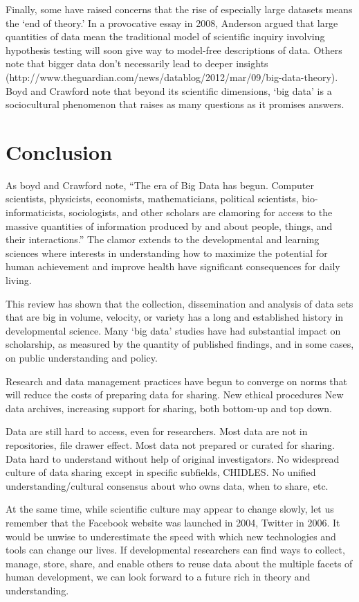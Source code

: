 \documentclass[letterpaper,man,apacite]{apa6}
\begin{document}
Finally, some have raised concerns that the rise of especially large datasets means the `end of theory.' \cite{Anderson}
In a provocative essay in 2008, Anderson argued that large quantities of data mean the traditional model of scientific inquiry involving hypothesis testing will soon give way to model-free descriptions of data.
Others note that bigger data don't necessarily lead to deeper insights \cite{Graham} (http://www.theguardian.com/news/datablog/2012/mar/09/big-data-theory).
Boyd and Crawford note \cite{boyd} that beyond its scientific dimensions, `big data' is a sociocultural phenomenon that raises as many questions as it promises answers.

\section{Conclusion}

As boyd and Crawford note, ``The era of Big Data has begun. Computer scientists, physicists, economists, mathematicians, political scientists, bio-informaticists, sociologists, and other scholars are clamoring for access to the massive quantities of information produced by and about people, things, and their interactions.'' \cite{boyd}
The clamor extends to the developmental and learning sciences where interests in understanding how to maximize the potential for human achievement and improve health have significant consequences for daily living.

This review has shown that the collection, dissemination and analysis of data sets that are big in volume, velocity, or variety has a long and established history in developmental science.
Many `big data' studies have had substantial impact on scholarship, as measured by the quantity of published findings, and in some cases, on public understanding and policy.

Research and data management practices have begun to converge on norms that will reduce the costs of preparing data for sharing.
New ethical procedures
New data archives, increasing support for sharing, both bottom-up and top down.

Data are still hard to access, even for researchers.
Most data are not in repositories, file drawer effect.
Most data not prepared or curated for sharing.
Data hard to understand without help of original investigators.
No widespread culture of data sharing except in specific subfields, CHIDLES.
No unified understanding/cultural consensus about who owns data, when to share, etc.

At the same time, while scientific culture may appear to change slowly, let us remember that the Facebook website was launched in 2004, Twitter in 2006.
It would be unwise to underestimate the speed with which new technologies and tools can change our lives.
If developmental researchers can find ways to collect, manage, store, share, and enable others to reuse data about the multiple facets of human development, we can look forward to a future rich in theory and understanding.


\end{document}
